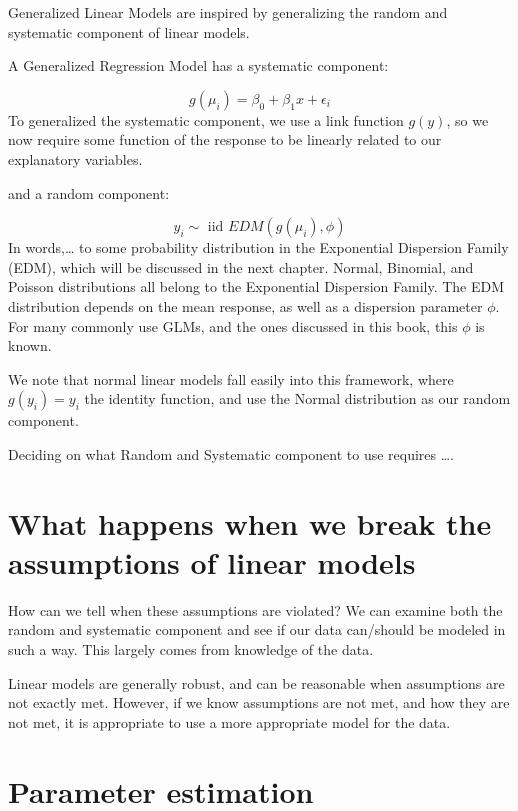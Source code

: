 \documentclass[
]{book}
\begin{document}
Generalized Linear Models are inspired by generalizing the random and systematic component of linear models.

A Generalized Regression Model has a systematic component:

\[ g(\mu_i) = \beta_0 + \beta_1 x + \epsilon_i\]
To generalized the systematic component, we use a link function \(g(y)\), so we now require some function of the response to be linearly related to our explanatory variables.

and a random component:

\[y_i \sim \text{ iid } EDM(g(\mu_i), \phi) \]
In words,\ldots{} to some probability distribution in the Exponential Dispersion Family (EDM), which will be discussed in the next chapter. Normal, Binomial, and Poisson distributions all belong to the Exponential Dispersion Family. The EDM distribution depends on the mean response, as well as a dispersion parameter \(\phi\). For many commonly use GLMs, and the ones discussed in this book, this \(\phi\) is known.

We note that normal linear models fall easily into this framework, where \(g(y_i) = y_i\) the identity function, and use the Normal distribution as our random component.

Deciding on what Random and Systematic component to use requires \ldots.

\hypertarget{what-happens-when-we-break-the-assumptions-of-linear-models}{%
\section{What happens when we break the assumptions of linear models}\label{what-happens-when-we-break-the-assumptions-of-linear-models}}

How can we tell when these assumptions are violated? We can examine both the random and systematic component and see if our data can/should be modeled in such a way. This largely comes from knowledge of the data.

Linear models are generally robust, and can be reasonable when assumptions are not exactly met. However, if we know assumptions are not met, and how they are not met, it is appropriate to use a more appropriate model for the data.

\hypertarget{parameter-estimation}{%
\section{Parameter estimation}\label{parameter-estimation}}
\end{document}
